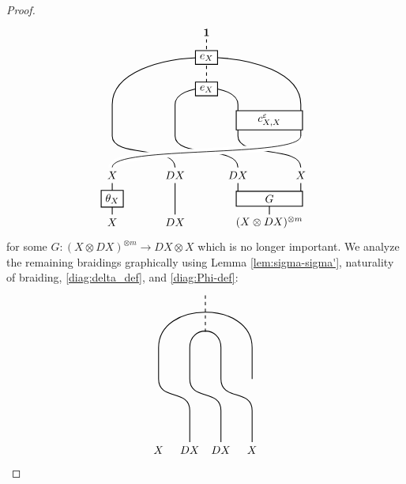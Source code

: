 \documentclass[11pt, reqno]{amsart}
\theoremstyle{definition}\newtheorem{defi}[thm]{Definition}
\theoremstyle{definition}\newtheorem{rem}[thm]{Remark}
\theoremstyle{definition}\newtheorem{exam}[thm]{Example}
\theoremstyle{definition}\newtheorem{assum}[thm]{Assumption}
\newcommand{\vac}{\mathbf{1}}
\begin{document}
\begin{proof}
\begin{equation}
\begin{matrix}
    \begin{tikzpicture}[scale = 1, baseline = {(current bounding box.center)}, line width=0.75pt]
    \node at (0,-.25) {$X$};
    \node at (2,-.25) {$DX$};
    \node at (5,-.25) {$(X\otimes DX)^{\otimes m}$};
    \node at (0,1.25) {$X$};
    \node at (2,1.25) {$DX$};
    \node at (4,1.25) {$DX$}; 
    \node at (6,1.25) {$X$};
    \draw (0,0) -- (0,1);
    \draw (2,0) -- (2,1);
    \draw (5,0) -- (5,.5);
    \draw (4,.5) -- (4,1);
    \draw (6,.5) -- (6,1);
    \draw[dashed] (3,4) -- (3,5.6);
    \draw (4,1.5) .. controls (4,2.2) and (2,1.8) .. (2,2.5) -- (2,3.5) .. controls (2,4.2) and (4,4.2) .. (4,3.5) -- (4,2.5) .. controls (4,1.8) and (6,2.2) .. (6,1.5);
    \draw (2,1.5) .. controls (2,2.2) and (0,1.8) .. (0,2.5) -- (0,3.5) .. controls (0,5.5) and (6,5.5) .. (6,3.5) -- (6,2.5);
     \draw[white, double=black, line width = 3pt ] (0,1.5) .. controls (0,2.2) and (6,1.8) .. (6,2.5);
    \node at (0,.5) [draw,minimum width=20pt,minimum height=10pt,thick, fill=white] {$\theta_{X}$};
    \node at (5,.5) [draw,minimum width=60pt,minimum height=10pt,thick, fill=white] {$G$};
    \node at (5,3) [draw,minimum width=60pt,minimum height=10pt,thick, fill=white] {$c_{X,X}^{\varepsilon}$};
     \node at (3,4) [draw,minimum width=20pt,minimum height=10pt,thick, fill=white] {$e_X$};
      \node at (3,5) [draw,minimum width=20pt,minimum height=10pt,thick, fill=white] {$e_X$};
     \node at (3,5.8) {$\vac$};
    \end{tikzpicture}
    \end{matrix}
    \end{equation}
    for some $G: (X\otimes DX)^{\otimes m}\rightarrow DX\otimes X$ which is no longer important. We analyze the remaining braidings graphically using Lemma \ref{lem:sigma-sigma'}, naturality of braiding, \eqref{diag:delta_def}, and \eqref{diag:Phi-def}:
    \begin{align}\label{eqn:main-thm-calc2}
    \begin{matrix}
    \begin{tikzpicture}[scale = 1, baseline = {(current bounding box.center)}, line width=0.75pt]
    \node at (0,.25) {$X$};
    \node at (1,.25) {$DX$};
    \node at (2,.25) {$DX$}; 
    \node at (3,.25) {$X$};
    \draw[dashed] (1.5,4) -- (1.5,5.25);
    \draw (2,.5) -- (2,1.5) .. controls (2,2.2) and (1,1.8) .. (1,2.5) -- (1,3.5) .. controls (1,4.2) and (2,4.2) .. (2,3.5) -- (2,2.5) .. controls (2,1.8) and (3,2.2) .. (3,1.5) -- (3,.5);
    \draw (1,.5) -- (1,1.5) .. controls (1,2.2) and (0,1.8) .. (0,2.5) -- (0,3.5) .. controls (0,5) and (3,5) .. (3,3.5) -- (3,2.5);

\end{tikzpicture}
\end{matrix}
\end{align}
\end{proof}
\end{document}
